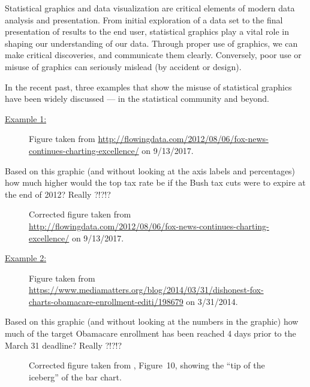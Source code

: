 \documentclass[12pt,letterpaper,final]{article}
\begin{document}
Statistical graphics and data visualization are critical 
elements of modern data analysis and presentation.  From initial
exploration of a data set to the final presentation of results to
the end user, statistical graphics play a vital role in shaping our understanding
of our data.  Through proper use of graphics, we can make critical
discoveries, and communicate them clearly.  Conversely, poor use
or misuse of graphics can seriously mislead (by accident or design).

In the recent past, three examples that show the misuse of statistical graphics
have been widely discussed --- in the statistical community and beyond.


\newpage


\underline{Example 1:}


\begin{figure}[ht]
\caption{\label{FoxNews_Bush-cuts2013}
Figure taken from
\url{http://flowingdata.com/2012/08/06/fox-news-continues-charting-excellence/}
on 9/13/2017.
}
\end{figure}


Based on this graphic (and without looking at the axis labels and percentages)
how much higher would the top tax rate be if the Bush tax cuts were to expire
at the end of 2012? Really ?!?!?


\begin{figure}[ht]
\caption{\label{FoxNews_Bush-cuts2013_corrected}
Corrected figure taken from
\url{http://flowingdata.com/2012/08/06/fox-news-continues-charting-excellence/}
on 9/13/2017.
}
\end{figure}


\newpage


\underline{Example 2:}


\begin{figure}[ht]
\caption{\label{Obamacare1}
Figure taken from
\url{https://www.mediamatters.org/blog/2014/03/31/dishonest-fox-charts-obamacare-enrollment-editi/198679}
on 3/31/2014.
}
\end{figure}


Based on this graphic (and without looking at the numbers in the graphic)
how much of the target Obamacare enrollment has been reached 4 days prior to the 
March 31 deadline? Really ?!?!?


\begin{figure}[ht]
\caption{\label{Obamacare2}
Corrected figure taken from \cite{HRS2014}, Figure~10, showing the ``tip of
the iceberg'' of the bar chart.
}
\end{figure}
\end{document}
